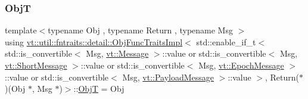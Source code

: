 \subsubsection{\texorpdfstring{ObjT}{ObjT}}
{\footnotesize\ttfamily template$<$typename Obj , typename Return , typename Msg $>$ \\
using \hyperlink{structvt_1_1util_1_1fntraits_1_1detail_1_1_obj_func_traits_impl}{vt\+::util\+::fntraits\+::detail\+::\+Obj\+Func\+Traits\+Impl}$<$ std\+::enable\+\_\+if\+\_\+t$<$ std\+::is\+\_\+convertible$<$ Msg, \hyperlink{namespacevt_a3a3ddfef40b4c90915fa43cdd5f129ea}{vt\+::\+Message} $>$\+::value or std\+::is\+\_\+convertible$<$ Msg, \hyperlink{namespacevt_a1125ac1da6c0bbf141e0ea0739d7602d}{vt\+::\+Short\+Message} $>$\+::value or std\+::is\+\_\+convertible$<$ Msg, \hyperlink{namespacevt_ad67368ffae52d7325002586b41bb150e}{vt\+::\+Epoch\+Message} $>$\+::value or std\+::is\+\_\+convertible$<$ Msg, \hyperlink{namespacevt_a89a92229c5622b855c02c549f83a1a68}{vt\+::\+Payload\+Message} $>$\+::value $>$, Return($\ast$)(Obj $\ast$, Msg $\ast$)$>$\+::\hyperlink{structvt_1_1util_1_1fntraits_1_1detail_1_1_obj_func_traits_impl_3_01std_1_1enable__if__t_3_01std573a703ad4f1a8441021e31e0f1928d5_a7d703d5a1f0330b7b6cbb5e221d9f8c5}{ObjT} =  Obj}

